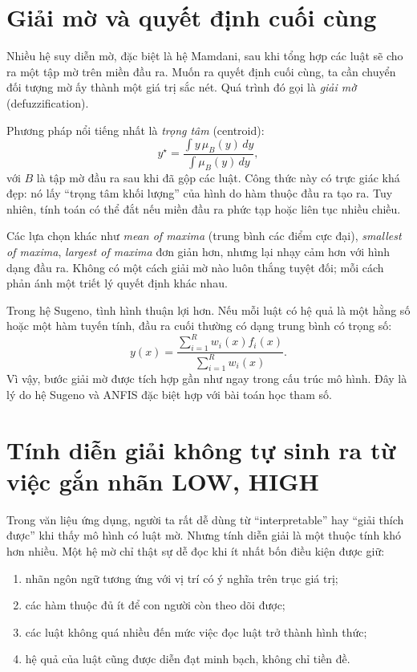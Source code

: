 \section{Giải mờ và quyết định cuối cùng}

Nhiều hệ suy diễn mờ, đặc biệt là hệ Mamdani, sau khi tổng hợp các luật sẽ cho ra một tập mờ trên miền đầu ra. Muốn ra quyết định cuối cùng, ta cần chuyển đối tượng mờ ấy thành một giá trị sắc nét. Quá trình đó gọi là \emph{giải mờ} (defuzzification).

Phương pháp nổi tiếng nhất là \emph{trọng tâm} (centroid):
\[
y^\star=\frac{\int y\,\mu_B(y)\,dy}{\int \mu_B(y)\,dy},
\]
với \(B\) là tập mờ đầu ra sau khi đã gộp các luật. Công thức này có trực giác khá đẹp: nó lấy ``trọng tâm khối lượng'' của hình do hàm thuộc đầu ra tạo ra. Tuy nhiên, tính toán có thể đắt nếu miền đầu ra phức tạp hoặc liên tục nhiều chiều.

Các lựa chọn khác như \emph{mean of maxima} (trung bình các điểm cực đại), \emph{smallest of maxima}, \emph{largest of maxima} đơn giản hơn, nhưng lại nhạy cảm hơn với hình dạng đầu ra. Không có một cách giải mờ nào luôn thắng tuyệt đối; mỗi cách phản ánh một triết lý quyết định khác nhau.

Trong hệ Sugeno, tình hình thuận lợi hơn. Nếu mỗi luật có hệ quả là một hằng số hoặc một hàm tuyến tính, đầu ra cuối thường có dạng trung bình có trọng số:
\[
y(x)=\frac{\sum_{i=1}^R w_i(x)f_i(x)}{\sum_{i=1}^R w_i(x)}.
\]
Vì vậy, bước giải mờ được tích hợp gần như ngay trong cấu trúc mô hình. Đây là lý do hệ Sugeno và ANFIS đặc biệt hợp với bài toán học tham số.

\section{Tính diễn giải không tự sinh ra từ việc gắn nhãn LOW, HIGH}

Trong văn liệu ứng dụng, người ta rất dễ dùng từ ``interpretable'' hay ``giải thích được'' khi thấy mô hình có luật mờ. Nhưng tính diễn giải là một thuộc tính khó hơn nhiều. Một hệ mờ chỉ thật sự dễ đọc khi ít nhất bốn điều kiện được giữ:
\begin{enumerate}
\item nhãn ngôn ngữ tương ứng với vị trí có ý nghĩa trên trục giá trị;
\item các hàm thuộc đủ ít để con người còn theo dõi được;
\item các luật không quá nhiều đến mức việc đọc luật trở thành hình thức;
\item hệ quả của luật cũng được diễn đạt minh bạch, không chỉ tiền đề.
\end{enumerate}

